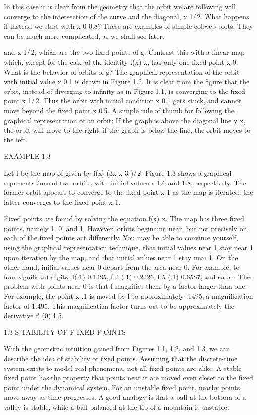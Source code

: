 In this case it is clear from the geometry that the orbit we are following will converge to the 
intersection of the curve and the diagonal, x  1 ̸ 2. What happens if instead we start with x 0  0.8? These 
are examples of simple cobweb plots. They can be much more complicated, as we shall see later.

and x  1 ̸ 2, which are the two ﬁxed points of g. Contrast this with a linear map which, except for the 
case of the identity f(x)  x, has only one ﬁxed point x  0. What is the behavior of orbits of g? The 
graphical representation of the orbit with initial value x  0.1 is drawn in Figure 1.2. It is clear from 
the ﬁgure that the orbit, instead of diverging to inﬁnity as in Figure 1.1, is converging to the ﬁxed 
point x  1 ̸ 2. Thus the orbit with initial condition x  0.1 gets stuck, and cannot move beyond the ﬁxed 
point x  0.5. A simple rule of thumb for following the graphical representation of an orbit: If the graph 
is above the diagonal line y  x, the orbit will move to the right; if the graph is below the line, the 
orbit moves to the left.

EXAMPLE 1.3

Let f be the map of given by f(x)  (3x  x 3 ) ̸ 2. Figure 1.3 shows a graphical representations of two 
orbits, with initial values x  1.6 and 1.8, respectively. The former orbit appears to converge to the ﬁxed 
point x  1 as the map is iterated; the latter converges to the ﬁxed point x  1.

Fixed points are found by solving the equation f(x)  x. The map has three ﬁxed points, namely 1, 0, and 1. 
However, orbits beginning near, but not precisely on, each of the ﬁxed points act differently. You may be 
able to convince yourself, using the graphical representation technique, that initial values near 1 stay 
near 1 upon iteration by the map, and that initial values near 1 stay near 1. On the other hand, initial 
values near 0 depart from the area near 0. For example, to four signiﬁcant digits, f(.1)  0.1495, f 2 (.1)  
0.2226, f 5 (.1)  0.6587, and so on. The problem with points near 0 is that f magniﬁes them by a factor 
larger than one. For example, the point x  .1 is moved by f to approximately .1495, a magniﬁcation factor 
of 1.495. This magniﬁcation factor turns out to be approximately the derivative f′ (0)  1.5.

1.3 S TABILITY OF F IXED P OINTS

With the geometric intuition gained from Figures 1.1, 1.2, and 1.3, we can describe the idea of stability 
of ﬁxed points. Assuming that the discrete-time system exists to model real phenomena, not all ﬁxed 
points are alike. A stable ﬁxed point has the property that points near it are moved even closer to the 
ﬁxed point under the dynamical system. For an unstable ﬁxed point, nearby points move away as time 
progresses. A good analogy is that a ball at the bottom of a valley is stable, while a ball balanced at the 
tip of a mountain is unstable.


